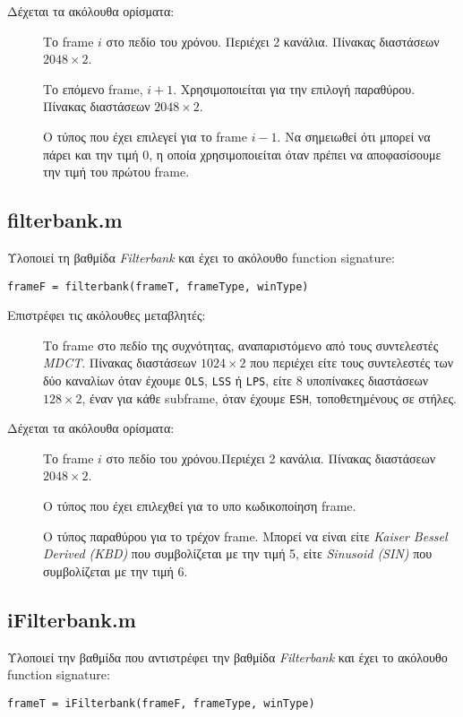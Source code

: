 \noindent Δέχεται τα ακόλουθα ορίσματα:
\begin{description}
\item[] Το frame $i$ στο πεδίο του χρόνου. Περιέχει 2 κανάλια.
	Πίνακας διαστάσεων $2048 \times 2$.
\item[] Το επόμενο frame, $i + 1$. Χρησιμοποιείται για την
	επιλογή παραθύρου. Πίνακας διαστάσεων $2048 \times 2$.
\item[] Ο τύπος που έχει επιλεγεί για το frame $i - 1$. Να
	σημειωθεί ότι μπορεί να πάρει και την τιμή 0, η οποία χρησιμοποιείται όταν
	πρέπει να αποφασίσουμε την τιμή του πρώτου frame.
\end{description}


\subsection*{filterbank.m}
Υλοποιεί τη βαθμίδα \emph{Filterbank} και έχει το ακόλουθο function signature:
\begin{center}
	\verb|frameF = filterbank(frameT, frameType, winType)|
\end{center}

\noindent Επιστρέφει τις ακόλουθες μεταβλητές:
\begin{description}
\item[] Το frame στο πεδίο της συχνότητας, αναπαριστόμενο από τους
	συντελεστές \emph{MDCT}. Πίνακας διαστάσεων $1024 \times 2$  που περιέχει
	είτε τους συντελεστές των δύο καναλίων όταν έχουμε \verb|OLS|, \verb|LSS|
	ή \verb|LPS|, είτε 8 υποπίνακες διαστάσεων $128 \times 2$, έναν για κάθε
	subframe, όταν έχουμε \verb|ESH|, τοποθετημένους σε στήλες.
\end{description}

\noindent Δέχεται τα ακόλουθα ορίσματα:
\begin{description}
\item[] Το frame $i$ στο πεδίο του χρόνου.Περιέχει 2 κανάλια.
	Πίνακας διαστάσεων $2048 \times 2$.
\item[] Ο τύπος που έχει επιλεχθεί για το υπο κωδικοποίηση frame.
\item[] Ο τύπος παραθύρου για το τρέχον frame. Μπορεί να είναι είτε
	\emph{Kaiser Bessel Derived (KBD)} που συμβολίζεται με την τιμή 5, είτε
	\emph{Sinusoid (SIN)} που συμβολίζεται με την τιμή 6.
\end{description}


\subsection*{iFilterbank.m}
Υλοποιεί την βαθμίδα που αντιστρέφει την βαθμίδα \emph{Filterbank} και έχει το
ακόλουθο function signature:
\begin{center}
	\verb|frameT = iFilterbank(frameF, frameType, winType)|
\end{center}


